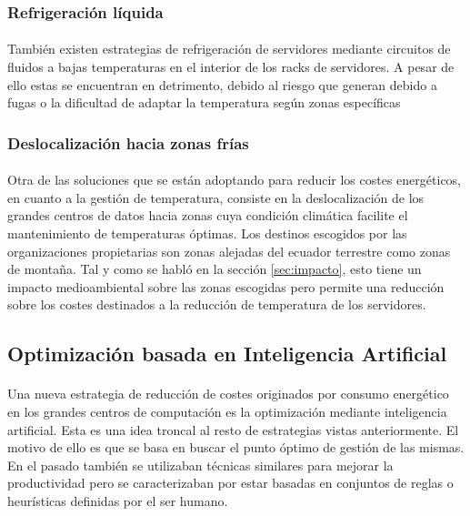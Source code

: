 \documentclass[10pt]{article}
\begin{document}
			\subsubsection{Refrigeración líquida}

				\paragraph{}
				También existen estrategias de refrigeración de servidores mediante circuitos de fluidos a bajas temperaturas en el interior de los racks de servidores. A pesar de ello estas se encuentran en detrimento, debido al riesgo que generan debido a fugas o la dificultad de adaptar la temperatura según zonas específicas

			\subsubsection{Deslocalización hacia zonas frías}

				\paragraph{}
				Otra de las soluciones que se están adoptando para reducir los costes energéticos, en cuanto a la gestión de temperatura, consiste en la deslocalización de los grandes centros de datos hacia zonas cuya condición climática facilite el mantenimiento de temperaturas óptimas. Los destinos escogidos por las organizaciones propietarias son zonas alejadas del ecuador terrestre como zonas de montaña. Tal y como se habló en la sección \ref{sec:impacto}, esto tiene un impacto medioambiental sobre las zonas escogidas pero permite una reducción sobre los costes destinados a la reducción de temperatura de los servidores.

		\subsection{Optimización basada en Inteligencia Artificial}

			\paragraph{}
			Una nueva estrategia de reducción de costes originados por consumo energético en los grandes centros de computación es la optimización mediante inteligencia artificial. Esta es una idea troncal al resto de estrategias vistas anteriormente. El motivo de ello es que se basa en buscar el punto óptimo de gestión de las mismas. En el pasado también se utilizaban técnicas similares para mejorar la productividad pero se caracterizaban por estar basadas en conjuntos de reglas o heurísticas definidas por el ser humano.
\end{document}
